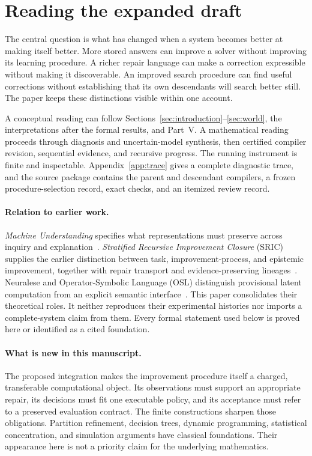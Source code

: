 \documentclass[11pt,letterpaper]{article}
\theoremstyle{plain}
\theoremstyle{definition}
\begin{document}
\section*{Reading the expanded draft}
The central question is what has changed when a system becomes better at making itself better. More stored answers can improve a solver without improving its learning procedure. A richer repair language can make a correction expressible without making it discoverable. An improved search procedure can find useful corrections without establishing that its own descendants will search better still. The paper keeps these distinctions visible within one account.

A conceptual reading can follow Sections~\ref{sec:introduction}--\ref{sec:world}, the interpretations after the formal results, and Part~V. A mathematical reading proceeds through diagnosis and uncertain-model synthesis, then certified compiler revision, sequential evidence, and recursive progress. The running instrument is finite and inspectable. Appendix~\ref{app:trace} gives a complete diagnostic trace, and the source package contains the parent and descendant compilers, a frozen procedure-selection record, exact checks, and an itemized review record.

\paragraph{Relation to earlier work.}
\emph{Machine Understanding} specifies what representations must preserve across inquiry and explanation~\cite{understanding}. \emph{Stratified Recursive Improvement Closure} (SRIC) supplies the earlier distinction between task, improvement-process, and epistemic improvement, together with repair transport and evidence-preserving lineages~\cite{sric}. Neuralese and Operator-Symbolic Language (OSL) distinguish provisional latent computation from an explicit semantic interface~\cite{neuralese,osl}. This paper consolidates their theoretical roles. It neither reproduces their experimental histories nor imports a complete-system claim from them. Every formal statement used below is proved here or identified as a cited foundation.

\paragraph{What is new in this manuscript.}
The proposed integration makes the improvement procedure itself a charged, transferable computational object. Its observations must support an appropriate repair, its decisions must fit one executable policy, and its acceptance must refer to a preserved evaluation contract. The finite constructions sharpen those obligations. Partition refinement, decision trees, dynamic programming, statistical concentration, and simulation arguments have classical foundations. Their appearance here is not a priority claim for the underlying mathematics.
\end{document}
